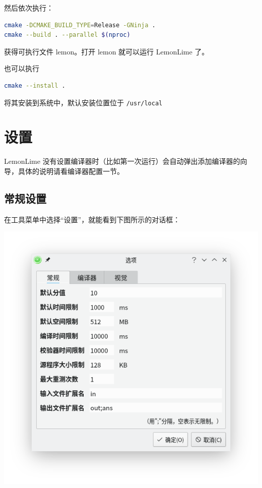 \documentclass[UTF-8]{ctexart}
\begin{document}
				然后依次执行：
				
				\begin{lstlisting}[language=bash,frame=shadowbox,basicstyle=\ttfamily]
cmake -DCMAKE_BUILD_TYPE=Release -GNinja .
cmake --build . --parallel $(nproc)
				\end{lstlisting}
				
				获得可执行文件 lemon。打开 lemon 就可以运行 LemonLime 了。
				
				也可以执行
				
				\begin{lstlisting}[language=bash,frame=shadowbox,basicstyle=\ttfamily]
cmake --install .
				\end{lstlisting}
				将其安装到系统中，默认安装位置位于 \verb|/usr/local|
			
		\newpage
		
		\section{设置}
		
			LemonLime 没有设置编译器时（比如第一次运行）会自动弹出添加编译器的向导，具体的说明请看编译器配置一节。
		
			\subsection{常规设置}
			
				在工具菜单中选择“设置”，就能看到下图所示的对话框：
				
				\begin{center}
				\includegraphics[scale=0.7]{pics/generalsettings.png}
				\end{center}
			
\end{document}
